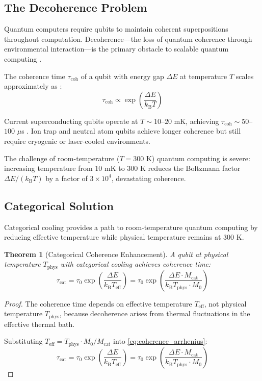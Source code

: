 \documentclass[twocolumn,10pt,twoside]{article}
\newtheorem{theorem}{Theorem}[section]
\newcommand{\kb}{k_{\mathrm{B}}}
\newcommand{\Teff}{T_{\mathrm{eff}}}
\newcommand{\Tphys}{T_{\mathrm{phys}}}
\newcommand{\Mcat}{M_{\mathrm{cat}}}
\begin{document}
\subsection{The Decoherence Problem}

Quantum computers require qubits to maintain coherent superpositions throughout computation. Decoherence---the loss of quantum coherence through environmental interaction---is the primary obstacle to scalable quantum computing \cite{zurek2003,schlosshauer2007}.

The coherence time $\tau_{\text{coh}}$ of a qubit with energy gap $\Delta E$ at temperature $T$ scales approximately as \cite{slichter1990}:
\begin{equation}
\tau_{\text{coh}} \propto \exp\left(\frac{\Delta E}{\kb T}\right)
\label{eq:coherence_arrhenius}
\end{equation}

Current superconducting qubits operate at $T \sim 10$--$20$ mK, achieving $\tau_{\text{coh}} \sim 50$--$100$ $\mu$s \cite{kjaergaard2020,arute2019}. Ion trap and neutral atom qubits achieve longer coherence but still require cryogenic or laser-cooled environments.

The challenge of room-temperature ($T = 300$ K) quantum computing is severe: increasing temperature from 10 mK to 300 K reduces the Boltzmann factor $\Delta E/(\kb T)$ by a factor of $3 \times 10^4$, devastating coherence.

\subsection{Categorical Solution}

Categorical cooling provides a path to room-temperature quantum computing by reducing effective temperature while physical temperature remains at 300 K.

\begin{theorem}[Categorical Coherence Enhancement]
\label{thm:coherence_enhancement}
A qubit at physical temperature $\Tphys$ with categorical cooling achieves coherence time:
\begin{equation}
\tau_{\text{cat}} = \tau_0 \exp\left(\frac{\Delta E}{\kb \Teff}\right) = \tau_0 \exp\left(\frac{\Delta E \cdot \Mcat}{\kb \Tphys \cdot M_0}\right)
\label{eq:categorical_coherence}
\end{equation}
\end{theorem}

\begin{proof}
The coherence time depends on effective temperature $\Teff$, not physical temperature $\Tphys$, because decoherence arises from thermal fluctuations in the effective thermal bath.

Substituting $\Teff = \Tphys \cdot M_0/\Mcat$ into \eqref{eq:coherence_arrhenius}:
\begin{equation}
\tau_{\text{cat}} = \tau_0 \exp\left(\frac{\Delta E}{\kb \Teff}\right) = \tau_0 \exp\left(\frac{\Delta E \cdot \Mcat}{\kb \Tphys \cdot M_0}\right)
\end{equation}
\end{proof}
\end{document}
